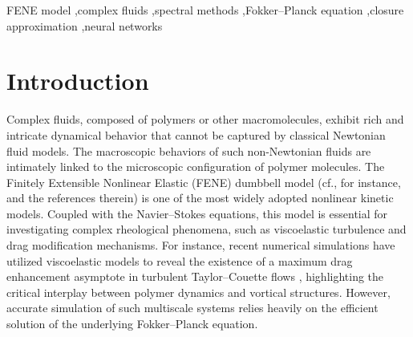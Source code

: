 \documentclass[preprint,12pt]{elsarticle}
\begin{document}
\begin{frontmatter}
\begin{keyword}
FENE model \sep complex fluids \sep spectral methods \sep Fokker--Planck equation \sep closure approximation \sep neural networks
\end{keyword}

\end{frontmatter}

\section{Introduction}

Complex fluids, composed of polymers or other macromolecules, exhibit rich and intricate dynamical behavior that cannot be captured by classical Newtonian fluid models. The macroscopic behaviors of such non-Newtonian fluids are intimately linked to the microscopic configuration of polymer molecules. The Finitely Extensible Nonlinear Elastic (FENE) dumbbell model (cf., for instance, \cite{Warner72,Herrchen97,Barrett09} and the references therein) is one of the most widely adopted nonlinear kinetic models. Coupled with the Navier--Stokes equations, this model is essential for investigating complex rheological phenomena, such as viscoelastic turbulence and drag modification mechanisms. For instance, recent numerical simulations have utilized viscoelastic models to reveal the existence of a maximum drag enhancement asymptote in turbulent Taylor--Couette flows \cite{Liu24}, highlighting the critical interplay between polymer dynamics and vortical structures. However, accurate simulation of such multiscale systems relies heavily on the efficient solution of the underlying Fokker--Planck equation.
\end{document}
